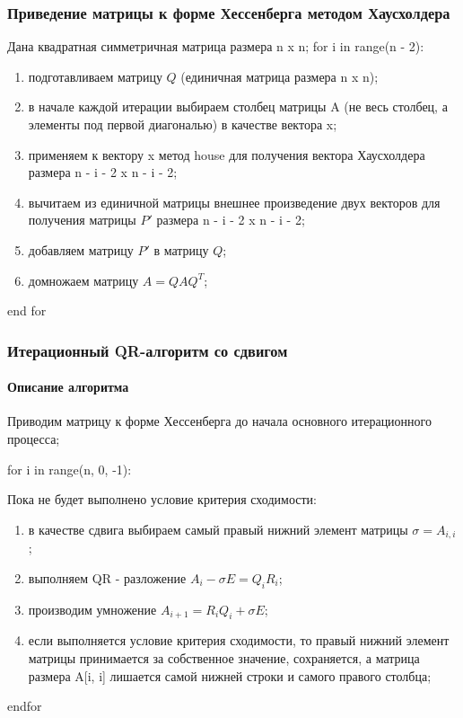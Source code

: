 \documentclass[a4paper]{article}
\begin{document}
\subsubsection{Приведение матрицы к форме Хессенберга методом Хаусхолдера}
Дана квадратная симметричная матрица размера n x n;
for i in range(n - 2):
\begin{enumerate}
\item подготавливаем матрицу $Q$ (единичная матрица размера n x n);
\item в начале каждой итерации выбираем столбец матрицы A (не весь столбец, а элементы под первой диагональю) в качестве вектора x;
\item применяем к вектору x метод house для получения вектора Хаусхолдера размера n - i - 2 x n - i - 2;
\item вычитаем из единичной матрицы внешнее произведение двух векторов для получения матрицы ${P}'$ размера n - i - 2 x n - i - 2;
\item добавляем матрицу ${P}'$ в матрицу $Q$;
\item домножаем матрицу $A = Q A Q^T$;
\end{enumerate}
end for



\newpage

\subsubsection{Итерационный QR-алгоритм со сдвигом}

\paragraph{Описание алгоритма}

Приводим матрицу к форме Хессенберга до начала основного итерационного процесса;

for i in range(n, 0, -1):

Пока не будет выполнено условие критерия сходимости:

\begin{enumerate}
\item в качестве сдвига выбираем самый правый нижний элемент матрицы $\sigma = A_{i, i}$;
\item выполняем QR - разложение $A_i - \sigma \! E= Q_i R_i$;
\item производим умножение $A_{i+1} = R_i Q_i + \sigma \! E$;
\item если выполняется условие критерия сходимости, то правый нижний элемент матрицы принимается за собственное значение, сохраняется, а матрица размера A[i, i] лишается самой нижней строки и самого правого столбца;
\end{enumerate}
endfor
\end{document}
